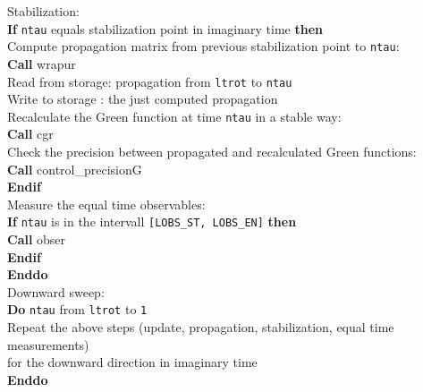 \begin{mdframed}[frametitle={Basic structure of the auxiliary-field QMC implementation (\path{Prog/main.F90}):}]
{\hspace*{3em}  Stabilization: \\     
\hspace*{3em} \textbf{If} \texttt{ntau} equals stabilization point in imaginary time \textbf{then}\\
\hspace*{4em} Compute propagation matrix from previous stabilization point to \texttt{ntau}: \\
\hspace*{4em} \textbf{Call} wrapur\\
\hspace*{4em} Read from storage: propagation from \texttt{ltrot} to \texttt{ntau}\\
\hspace*{4em} Write to storage : the just computed propagation \\
\hspace*{4em} Recalculate the Green function at time \texttt{ntau} in a stable way:\\
\hspace*{4em} \textbf{Call} cgr\\            
\hspace*{4em} Check the precision between propagated and recalculated Green functions:\\
\hspace*{4em} \textbf{Call} control\_precisionG\\
\hspace*{3em} \textbf{Endif}\\
    
\hspace*{3em} Measure the equal time observables: \\
\hspace*{3em} \textbf{If} \texttt{ntau} is in the intervall \texttt{[LOBS\_ST, LOBS\_EN]} \textbf{then}\\
\hspace*{4em} \textbf{Call} obser\\
\hspace*{3em} \textbf{Endif}\\
\hspace*{2em} \textbf{Enddo}\\

\hspace*{2em} Downward sweep:\\
\hspace*{2em} \textbf{Do} \texttt{ntau} from \texttt{ltrot} to \texttt{1}\\
\hspace*{3em} Repeat the above steps (update, propagation, stabilization, equal time measurements) \\
\hspace*{3em} for the downward direction in imaginary time\\
\hspace*{2em} \textbf{Enddo}\\

}
\end{mdframed}

